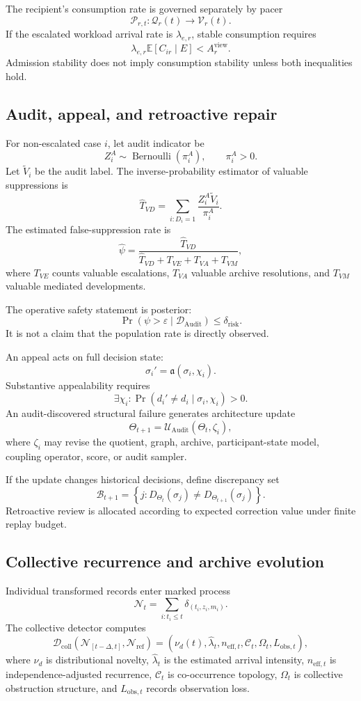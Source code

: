 \documentclass[11pt]{article}
\theoremstyle{definition}
\DeclareMathOperator{\Audit}{Audit}
\DeclareMathOperator{\Prob}{Pr}
\newcommand{\E}{\mathbb{E}}
\newcommand{\eps}{\varepsilon}
\begin{document}
The recipient's consumption rate is governed separately by pacer
\[
\mathcal{P}_{r,t}:
\mathcal{Q}_r(t)
\to
\mathcal{V}_r(t).
\]
If the escalated workload arrival rate is \(\lambda_{e,r}\), stable consumption requires
\[
\lambda_{e,r}
\E[C_{ir}\mid E]
<
A_r^{\mathrm{view}}.
\]
Admission stability does not imply consumption stability unless both inequalities hold.

\subsection{Audit, appeal, and retroactive repair}

For non-escalated case \(i\), let audit indicator be
\[
Z_i^{A}
\sim
\operatorname{Bernoulli}(\pi_i^{A}),
\qquad
\pi_i^{A}>0.
\]
Let \(\widetilde V_i\) be the audit label. The inverse-probability estimator of valuable suppressions is
\[
\widehat T_{VD}
=
\sum_{i:D_i=1}
\frac{
Z_i^{A}\widetilde V_i
}{
\pi_i^{A}
}.
\]
The estimated false-suppression rate is
\[
\widehat\psi
=
\frac{
\widehat T_{VD}
}{
\widehat T_{VD}+T_{VE}+T_{VA}+T_{VM}
},
\]
where \(T_{VE}\) counts valuable escalations, \(T_{VA}\) valuable archive resolutions, and \(T_{VM}\) valuable mediated developments.

The operative safety statement is posterior:
\[
\Prob(
\psi>\eps
\mid
\mathcal{D}_{\Audit}
)
\leq
\delta_{\mathrm{risk}}.
\]
It is not a claim that the population rate is directly observed.

An appeal acts on full decision state:
\[
\sigma_i'
=
\mathfrak{a}(\sigma_i,\chi_i).
\]
Substantive appealability requires
\[
\exists\chi_i:
\Prob(
d_i'\neq d_i
\mid
\sigma_i,\chi_i
)>0.
\]
An audit-discovered structural failure generates architecture update
\[
\Theta_{t+1}
=
\mathcal{U}_{\Audit}
\left(
\Theta_t,
\zeta_i
\right),
\]
where \(\zeta_i\) may revise the quotient, graph, archive, participant-state model, coupling operator, score, or audit sampler.

If the update changes historical decisions, define discrepancy set
\[
\mathcal{B}_{t+1}
=
\left\{
j:
D_{\Theta_t}(\sigma_j)
\neq
D_{\Theta_{t+1}}(\sigma_j)
\right\}.
\]
Retroactive review is allocated according to expected correction value under finite replay budget.

\subsection{Collective recurrence and archive evolution}

Individual transformed records enter marked process
\[
\mathcal{N}_t
=
\sum_{i:t_i\leq t}
\delta_{(t_i,z_i,m_i)}.
\]
The collective detector computes
\[
\mathcal{D}_{\mathrm{coll}}
\left(
\mathcal{N}_{[t-\Delta,t]},
\mathcal{N}_{\mathrm{ref}}
\right)
=
\left(
\nu_d(t),
\widehat\lambda_t,
n_{\mathrm{eff},t},
\mathcal{C}_t,
\Omega_t,
L_{\mathrm{obs},t}
\right),
\]
where \(\nu_d\) is distributional novelty, \(\widehat\lambda_t\) is the estimated arrival intensity, \(n_{\mathrm{eff},t}\) is independence-adjusted recurrence, \(\mathcal{C}_t\) is co-occurrence topology, \(\Omega_t\) is collective obstruction structure, and \(L_{\mathrm{obs},t}\) records observation loss.
\end{document}
